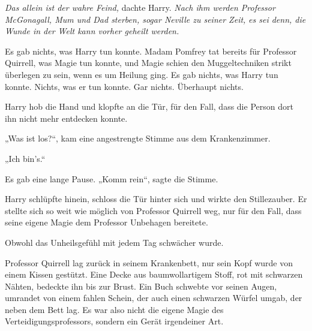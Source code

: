 \emph{Das allein ist der wahre Feind,} dachte Harry. \emph{Nach ihm werden Professor McGonagall, Mum und Dad sterben, sogar Neville zu seiner Zeit,} \emph{es sei denn, die Wunde in der Welt kann vorher geheilt werden.}

Es gab nichts, was Harry tun konnte. Madam Pomfrey tat bereits für Professor Quirrell, was Magie tun konnte, und Magie schien den Muggeltechniken strikt überlegen zu sein, wenn es um Heilung ging.
Es gab nichts, was Harry tun konnte. Nichts, was er tun konnte. Gar nichts. Überhaupt nichts.

\later

Harry hob die Hand und klopfte an die Tür, für den Fall, dass die Person dort ihn nicht mehr entdecken konnte.

„Was ist los?“, kam eine angestrengte Stimme aus dem Krankenzimmer.

„Ich bin’s.“

Es gab eine lange Pause.
„Komm rein“, sagte die Stimme.

Harry schlüpfte hinein, schloss die Tür hinter sich und wirkte den Stillezauber.
Er stellte sich so weit wie möglich von Professor Quirrell weg, nur für den Fall, dass seine eigene Magie dem Professor Unbehagen bereitete.

Obwohl das Unheilsgefühl mit jedem Tag schwächer wurde.

Professor Quirrell lag zurück in seinem Krankenbett, nur sein Kopf wurde von einem Kissen gestützt. Eine Decke aus baumwollartigem Stoff, rot mit schwarzen Nähten, bedeckte ihn bis zur Brust. Ein Buch schwebte vor seinen Augen, umrandet von einem fahlen Schein, der auch einen schwarzen Würfel umgab, der neben dem Bett lag. Es war also nicht die eigene Magie des Verteidigungsprofessors, sondern ein Gerät irgendeiner Art.

